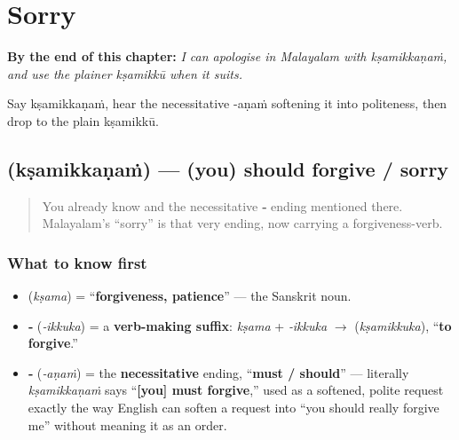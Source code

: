 
\chapter{Sorry}
\label{ch:ml-sorry}

\begin{chapteropening}
\textbf{By the end of this chapter:} \emph{I can apologise in Malayalam with kṣamikkaṇaṁ, and use the plainer kṣamikkū when it suits.}

Say kṣamikkaṇaṁ, hear the necessitative -aṇaṁ softening it into politeness, then drop to the plain kṣamikkū.
\end{chapteropening}

\section[\texorpdfstring{\ml{ക്ഷമിക്കണം} (kṣamikkaṇaṁ)}{ക്ഷമിക്കണം (kṣamikkaṇaṁ)}]{ (kṣamikkaṇaṁ) — (you) should forgive / sorry}

\label{lesson:ML-C09-kshamikkanam}



\begin{quote}
You already know \textbf{} and the necessitative \textbf{‑} ending mentioned there. Malayalam's \textquotedblleft{}sorry\textquotedblright{} is that very ending, now carrying a forgiveness-verb.
\end{quote}

\subsection*{What to know first}
\begin{itemize}
\raggedright
  \item \textbf{} (\emph{kṣama}) = \textquotedblleft{}\textbf{forgiveness, patience}\textquotedblright{} — the Sanskrit noun.
  \item \textbf{‑} (\emph{‑ikkuka}) = a \textbf{verb-making suffix}: \emph{kṣama} + \emph{‑ikkuka} $\to$ \textbf{} (\emph{kṣamikkuka}), \textquotedblleft{}\textbf{to forgive}.\textquotedblright{}
  \item \textbf{‑} (\emph{‑aṇaṁ}) = the \textbf{necessitative} ending, \textquotedblleft{}\textbf{must / should}\textquotedblright{} — literally \emph{kṣamikkaṇaṁ} says \textquotedblleft{}\textbf{{[}you{]} must forgive},\textquotedblright{} used as a softened, polite request exactly the way English can soften a request into \textquotedblleft{}you should really forgive me\textquotedblright{} without meaning it as an order.
\end{itemize}

